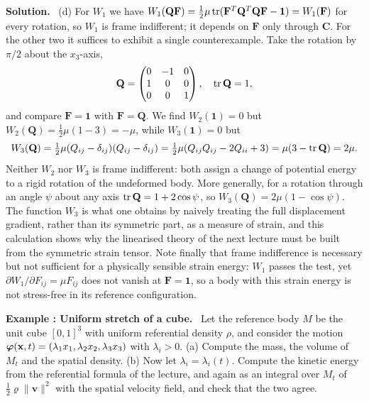\documentclass[a4paper,12pt]{paper}
\newcounter{example}
\renewenvironment{example}[1]{%
  \refstepcounter{example}%
  \begin{mdframed}[linewidth=1pt,innertopmargin=6pt,innerbottommargin=6pt]%
  \noindent\textbf{Example \theexample: #1.}\ }{%
  \end{mdframed}}
\newenvironment{solution}{\par\noindent\textbf{Solution.}\ }{\par\medskip}
\begin{document}
\begin{solution}
(d) For $W_{1}$ we have
$W_{1}(\mathbf{Q}\mathbf{F})=\tfrac{1}{2}\mu\,\mathrm{tr}(\mathbf{F}^{T}\mathbf{Q}^{T}\mathbf{Q}\mathbf{F}-\mathbf{1})=W_{1}(\mathbf{F})$
for every rotation, so $W_{1}$ is frame indifferent; it depends on $\mathbf{F}$ only through
$\mathbf{C}$. For the other two it suffices to exhibit a single counterexample. Take the
rotation by $\pi/2$ about the $x_{3}$-axis,
\begin{equation}
\mathbf{Q}=\begin{pmatrix}0&-1&0\\1&0&0\\0&0&1\end{pmatrix},\quad\mathrm{tr}\,\mathbf{Q}=1,
\label{eq:28}
\end{equation}
and compare $\mathbf{F}=\mathbf{1}$ with $\mathbf{F}=\mathbf{Q}$. We find
$W_{2}(\mathbf{1})=0$ but $W_{2}(\mathbf{Q})=\tfrac{1}{2}\mu(1-3)=-\mu$, while
$W_{3}(\mathbf{1})=0$ but
\begin{equation}
W_{3}(\mathbf{Q})=\tfrac{1}{2}\mu(Q_{ij}-\delta_{ij})(Q_{ij}-\delta_{ij})
=\tfrac{1}{2}\mu(Q_{ij}Q_{ij}-2Q_{ii}+3)=\mu(3-\mathrm{tr}\,\mathbf{Q})=2\mu.
\label{eq:29}
\end{equation}
Neither $W_{2}$ nor $W_{3}$ is frame indifferent: both assign a change of potential energy to
a rigid rotation of the undeformed body. More generally, for a rotation through an angle
$\psi$ about any axis $\mathrm{tr}\,\mathbf{Q}=1+2\cos\psi$, so $W_{3}(\mathbf{Q})=2\mu(1-\cos\psi)$.
The function $W_{3}$ is what one obtains by naively treating the full displacement gradient,
rather than its symmetric part, as a measure of strain, and this calculation shows why the
linearised theory of the next lecture must be built from the symmetric strain tensor. Note
finally that frame indifference is necessary but not sufficient for a physically sensible
strain energy: $W_{1}$ passes the test, yet $\partial W_{1}/\partial F_{ij}=\mu F_{ij}$ does
not vanish at $\mathbf{F}=\mathbf{1}$, so a body with this strain energy is not stress-free
in its reference configuration.
\end{solution}

\begin{example}{Uniform stretch of a cube}
Let the reference body $M$ be the unit cube $[0,1]^{3}$ with uniform referential density
$\rho$, and consider the motion
$\bm{\varphi}(\mathbf{x},t)=(\lambda_{1}x_{1},\lambda_{2}x_{2},\lambda_{3}x_{3})$ with
$\lambda_{i}>0$. (a) Compute the mass, the volume of $M_{t}$ and the spatial density.
(b) Now let $\lambda_{i}=\lambda_{i}(t)$. Compute the kinetic energy from the referential
formula of the lecture, and again as an integral over $M_{t}$ of
$\tfrac{1}{2}\varrho\|\mathbf{v}\|^{2}$ with the spatial velocity field, and check that the
two agree.
\end{example}
\end{document}
